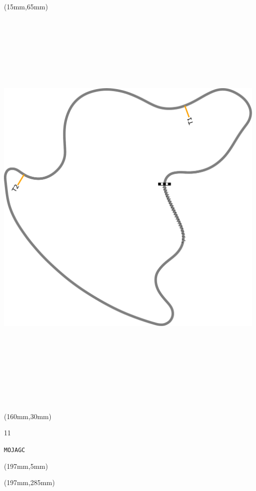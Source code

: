 \begin{textblock*}{185mm}(15mm,65mm)%
\centering
\mbox{\includegraphics[width=185mm,height=210mm,keepaspectratio]{PT/MOJAGC.pdf}}
\end{textblock*}
\begin{textblock*}{40mm}(160mm,30mm)%
\Large
\par{} 
\par11 
\par\hfill\tiny\tt MOJAGC\\
\end{textblock*}
\begin{textblock*}{20mm}(197mm,5mm)%
\fbox{\thepage}
\label{MOJAGC}
\end{textblock*}
\begin{textblock*}{20mm}(197mm,285mm)%
\fbox{\thepage}
\end{textblock*}

